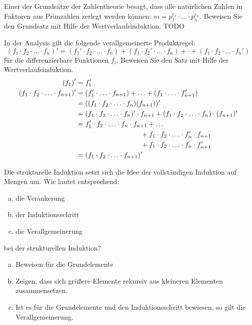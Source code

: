 \begin{card}
  Einer der Grundsätze der Zahlentheorie besagt, dass alle natürlichen Zahlen in Faktoren aus Primzahlen zerlegt werden
  können: $m = p_1^{e_1} \cdot \ldots \cdot p_n^{e_n}$. Beweisen Sie den Grundsatz mit Hilfe der Wertverlaufsinduktion.
  \hr
  TODO
\end{card}

\begin{card}
  In der Analysis gilt die folgende verallgemeinerte Produktregel:
  \[
  (f_1 \cdot f_2 \cdot \ldots \cdot f_n)' = (f_1' \cdot f_2 \cdot \ldots \cdot f_n) + (f_1 \cdot f_2' \cdot \ldots \cdot f_n) + \cdot + (f_1 \cdot f_2 \cdot \ldots \cdot f_n')
  \]
  für die differenzierbare Funktionen $f_i$. Beweisen Sie den Satz mit Hilfe der Wertverlaufsinduktion.
  \hr
  \begin{align*}
    \lrk f_1 \rrk ' &= f_1' \\
    (f_1 \cdot f_2 \cdot \ldots \cdot f_{n+1})' &= (f_1' \cdot \ldots \cdot f_{n+1}) + \ldots + (f_1 \cdot \ldots \cdot f_{n+1}') \\
    &= ((f_1 \cdot f_2 \cdot \ldots \cdot f_n)(f_{n+1}))' \\
    &= (f_1 \cdot f_2 \cdot \ldots \cdot f_n)' \cdot f_{n+1} + (f_1 \cdot f_2 \cdot \ldots \cdot f_n) \cdot (f_{n+1})' \\
    &= f_1' \cdot f_2 \cdot \ldots \cdot f_n \cdot f_{n+1} + \ldots \\
    & \hspace{3.3cm} + f_1 \cdot f_2 \cdot \ldots \cdot f_n' \cdot f_{n+1} \\
    & \hspace{3.3cm} + f_1 \cdot f_2 \cdot \ldots \cdot f_n \cdot f_{n+1}' \\
    &= (f_1 \cdot f_2 \cdot \ldots \cdot f_{n+1})' \\
  \end{align*}
\end{card}

\begin{card}
	Die strukturelle Induktion setzt sich die Idee der vollständigen Induktion auf Mengen um. Wie lautet entsprechend:
  \begin{enumerate}[a)]
	  \item die Verankerung
	  \item der Induktionsschritt
	  \item die Verallgemeinerung
	\end{enumerate}
	bei der strukturellen Induktion?
	\hr
  \begin{enumerate}[a)]
	  \item Beweisen für die Grundelemente
	  \item Zeigen, dass sich grüßere Elemente rekursiv aus kleineren Elementen zusammensetzen.
	  \item Ist es für die Grundelemente und den Induktionsschritt bewiesen, so gilt die Verallgemeinerung.
	\end{enumerate}
\end{card}

